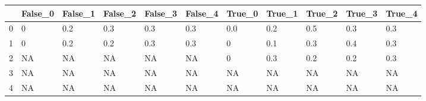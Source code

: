 \begin{tabular}{lllllllllll}
\toprule
{} & False\_0 & False\_1 & False\_2 & False\_3 & False\_4 & True\_0 & True\_1 & True\_2 & True\_3 & True\_4 \\ \hline
\midrule
0 &       0 &     0.2 &     0.3 &     0.3 &     0.3 &    0.0 &    0.2 &    0.5 &    0.3 &    0.3 \\ \hline
1 &       0 &     0.2 &     0.2 &     0.3 &     0.3 &      0 &    0.1 &    0.3 &    0.4 &    0.3 \\ \hline
2 &      NA &      NA &      NA &      NA &      NA &      0 &    0.3 &    0.2 &    0.2 &    0.3 \\ \hline
3 &      NA &      NA &      NA &      NA &      NA &     NA &     NA &     NA &     NA &     NA \\ \hline
4 &      NA &      NA &      NA &      NA &      NA &     NA &     NA &     NA &     NA &     NA \\ \hline
\bottomrule
\end{tabular}
